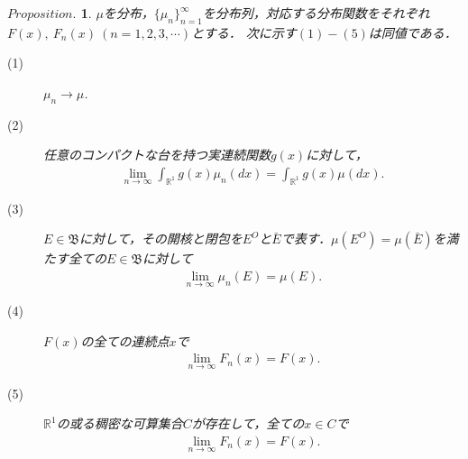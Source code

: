 \documentclass[a4j,papersize,disablejfam,slide,14pt]{jsarticle}
\newtheorem{Prop}{$Proposition.$}
\begin{document}
    \begin{screen}
    	\begin{Prop}
        	$\mu$を分布，$\{ \mu_n \}_{n=1}^{\infty}$を分布列，対応する分布関数をそれぞれ$F(x),\ F_n(x)\ (n=1,2,3,\cdots)$とする．
        	次に示す$(1)-(5)$は同値である．
            \begin{description}
            	\item[(1)]\qquad  $\mu_n \to \mu$.
                \item[(2)]\qquad 任意のコンパクトな台を持つ実連続関数$g(x)$に対して，
                	\begin{align}
                		\lim_{n \to \infty} \int_{\mathbb{R}^1} g(x) \mu_n(dx) = \int_{\mathbb{R}^1} g(x) \mu(dx).
                	\end{align}
                \item[(3)]\qquad $E \in \mathfrak{B}$に対して，その開核と閉包を$E^O$と$\bar{E}$で表す．$\mu(E^O) = \mu(\bar{E})$を満たす全ての$E \in \mathfrak{B}$に対して
                	\begin{align}
                		\lim_{n \to \infty} \mu_n(E) = \mu(E).
                	\end{align}
                \item[(4)]\qquad $F(x)$の全ての連続点$x$で
                	\begin{align}
                		\lim_{n \to \infty} F_n(x) = F(x).
                	\end{align}
                \item[(5)]\qquad $\mathbb{R}^1$の或る稠密な可算集合$C$が存在して，全ての$x \in C$で
                	\begin{align}
                    	\lim_{n \to \infty} F_n(x) = F(x).
                	\end{align}
            \end{description}
        \end{Prop}
    \end{screen}
\end{document}
